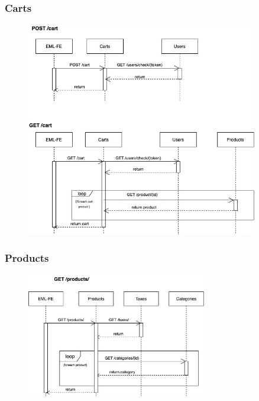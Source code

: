 \subsubsection{Carts}
\begin{figure}[H]
    \includegraphics[width=0.9\textwidth]{res/images/sequence-diagrams/carts.jpg}
\end{figure}

\subsubsection{Products}
\begin{figure}[H]
    \includegraphics[width=0.7\textwidth]{res/images/sequence-diagrams/products.jpg}
\end{figure}


